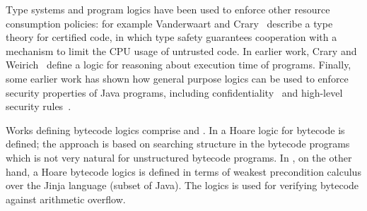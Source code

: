 


Type systems and program logics have been used to enforce other
resource consumption policies: for example Vanderwaart and
Crary~\cite{VC04fta} describe a type theory for certified code, in
which type safety guarantees cooperation with a mechanism to limit the
CPU usage of untrusted code. In earlier work, Crary and
Weirich~\cite{CW00rbc} define a logic for reasoning about execution
time of programs. Finally, some earlier work has shown how general
purpose logics can be used to enforce security properties of Java
programs, including confidentiality~\cite{gpt04:csfw} and high-level
security rules~\cite{m+04:cardis}.




Works defining bytecode logics comprise \cite{Q03plj} and
\cite{WN05abs}. In \cite{Q03plj} a Hoare logic for bytecode is
defined; the approach is based on searching structure in the bytecode
programs which is not very natural for unstructured bytecode
programs. In \cite{WN05abs}, on the other hand, a Hoare bytecode
logics is defined in terms of weakest precondition calculus over the
Jinja language (subset of Java). The logics is used for verifying
bytecode against arithmetic overflow.


